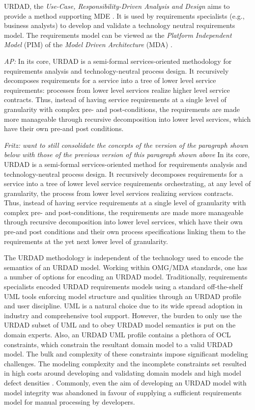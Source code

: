 URDAD, the {\em Use-Case, Responsibility-Driven Analysis and Design} \cite{solms_technology_2007} aims to provide a method supporting MDE \cite{solms_urdad_2010}. It is used by requirements specialists (e.g., business analysts) to develop and validate a technology neutral requirements model. The requirements model can be viewed as the {\em Platform Independent Model} (PIM) of the {\em Model Driven Architecture} (MDA) \cite{solms_urdad_2010}.

\emph{AP:}
In its core, URDAD is a semi-formal services-oriented methodology for requirements analysis and technology-neutral process design. It recursively decomposes requirements for a service into a tree of lower level service requirements: processes from lower level services realize higher level service contracts. Thus, instead of having service requirements at a single level of granularity with complex pre- and post-conditions, the requirements are made more manageable through recursive decomposition into lower level services, which have their own pre-and post conditions.

\emph{Fritz: want to still consolidate the concepts of the version of the paragraph shown below with those of the previous version of this paragraph shown above}
In its core, URDAD is a semi-formal services-oriented method for requirements analysis and technology-neutral process design. It recursively decomposes requirements for a service into a tree of lower level service requirements orchestrating, at any level of granularity, the process from lower level services realizing services contracts. Thus, instead of having service requirements at a single level of granularity with complex pre- and post-conditions, the requirements are made more manageable through recursive decomposition into lower level services, which have their own pre-and post conditions and their own process specifications linking them to the requirements at the yet next lower level of granularity.

The URDAD methodology is independent of the technology used to encode the semantics of an URDAD model. Working within OMG/MDA standards, one has a number of options for encoding an URDAD model. Traditionally, requirements specialists encoded URDAD requirements models using a standard off-the-shelf UML tools enforcing model structure and qualities through an URDAD profile and user discipline. UML is a natural choice due to its wide spread adoption in industry and comprehensive tool support. However, the burden to only use the URDAD subset of UML and to obey URDAD model semantics is put on the domain experts. Also, an URDAD UML profile contains a plethora of OCL constraints, which constrain the resultant domain model to a valid URDAD model. The bulk and complexity of these constraints impose significant modeling challenges. The modeling complexity and the incomplete constraints set resulted in high costs around developing and validating domain models and high model defect densities \cite{}. Commonly, even the aim of developing an URDAD model with model integrity was abandoned in favour of supplying a sufficient requirements model for manual processing by developers.

